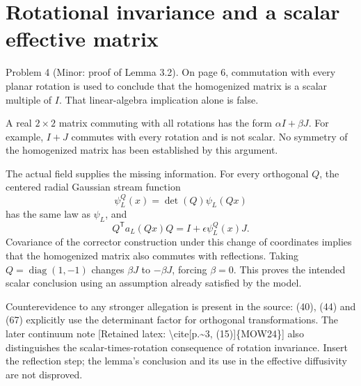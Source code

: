 \documentclass[10pt]{article}
\begin{document}
\section*{Rotational invariance and a scalar effective matrix}
Problem 4 (Minor: proof of Lemma 3.2).  On page 6, commutation with every planar rotation is used to conclude that the homogenized matrix is a scalar multiple of \(I\). That linear-algebra implication alone is false.\par
A real \(2\times2\) matrix commuting with all rotations has the form \(\alpha I+\beta J\). For example, \(I+J\) commutes with every rotation and is not scalar. No symmetry of the homogenized matrix has been established by this argument.\par
The actual field supplies the missing information. For every orthogonal \(Q\), the centered radial Gaussian stream function \[\psi_L^Q(x)=\det(Q)\psi_L(Qx)\] has the same law as \(\psi_L\), and \[Q^\mathsf T a_L(Qx)Q
     =I+\epsilon\psi_L^Q(x)J.\] Covariance of the corrector construction under this change of coordinates implies that the homogenized matrix also commutes with reflections. Taking \(Q=\operatorname{diag}(1,-1)\) changes \(\beta J\) to \(-\beta J\), forcing \(\beta=0\). This proves the intended scalar conclusion using an assumption already satisfied by the model.\par
Counterevidence to any stronger allegation is present in the source: (40), (44) and (67) explicitly use the determinant factor for orthogonal transformations. The later continuum note [Retained latex: \textbackslash{}cite[p.\textasciitilde{}3, (15)]\{MOW24\}] also distinguishes the scalar-times-rotation consequence of rotation invariance. Insert the reflection step; the lemma’s conclusion and its use in the effective diffusivity are not disproved.\par
\end{document}
